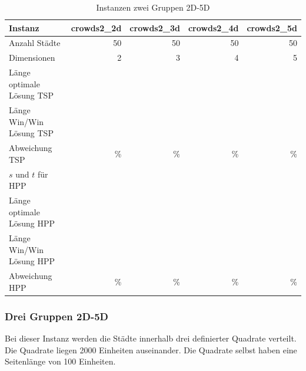\documentclass[11pt,a4paper]{article}
\begin{document}
\begin{table}[H]
        \centering
        \begin{tabular}{| l | r | r | r | r |}
            \hline
            Instanz                     & \textbf{crowds2\_2d}     
                                        & \textbf{crowds2\_3d}     
                                        & \textbf{crowds2\_4d}     
                                        & \textbf{crowds2\_5d}             \\ \hline
                Anzahl Städte               & 50        & 50       & 50         & 50        \\ \hline
                Dimensionen                 & 2         & 3        & 4          & 5         \\ \hline
                Länge optimale Lösung TSP   &           &          &            &           \\ \hline
                Länge Win/Win Lösung  TSP   &           &          &            &           \\ \hline
                Abweichung TSP              &     \%    &      \%  &      \%    &      \%   \\ \hline
                $s$ und $t$ für HPP         &           &          &            &           \\ \hline
                Länge optimale Lösung HPP   &           &          &            &           \\ \hline
                Länge Win/Win Lösung  HPP   &           &          &            &           \\ \hline
                Abweichung HPP              &     \%    &     \%   &     \%     &      \%   \\ \hline
        \end{tabular}
        \caption{Instanzen zwei Gruppen 2D-5D}
        \label{tab:instanzen_crowds2}
\end{table}

\subsubsection{Drei Gruppen 2D-5D}
Bei dieser Instanz werden die Städte innerhalb drei definierter Quadrate verteilt. Die Quadrate liegen 2000 Einheiten auseinander. Die Quadrate selbst haben eine Seitenlänge von 100 Einheiten.
\end{document}
